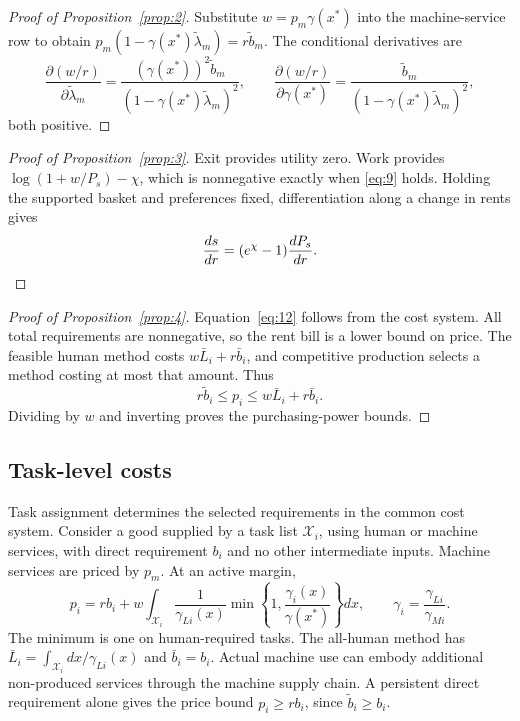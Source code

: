 \documentclass[12pt]{article}
\theoremstyle{plain}
\begin{document}
\begin{proof}[Proof of Proposition~\ref{prop:2}]
Substitute $w=p_m\gamma(x^*)$ into the machine-service row to obtain $p_m(1-\gamma(x^*)\widetilde{\lambda}_m)=r\widetilde{b}_m$. The conditional derivatives are
\[
\frac{\partial(w/r)}{\partial\widetilde{\lambda}_m}=\frac{(\gamma(x^*))^2\widetilde{b}_m}{(1-\gamma(x^*)\widetilde{\lambda}_m)^2},\qquad
\frac{\partial(w/r)}{\partial\gamma(x^*)}=\frac{\widetilde{b}_m}{(1-\gamma(x^*)\widetilde{\lambda}_m)^2},
\]
both positive.
\end{proof}

\begin{proof}[Proof of Proposition~\ref{prop:3}]
Exit provides utility zero. Work provides $\log(1+w/P_s)-\chi$, which is nonnegative exactly when \eqref{eq:9} holds. Holding the supported basket and preferences fixed, differentiation along a change in rents gives
\begin{equation}\label{eq:18}
\frac{ds}{dr}=(e^\chi-1)\frac{dP_s}{dr}.\qedhere
\end{equation}
\end{proof}

\begin{proof}[Proof of Proposition~\ref{prop:4}]
Equation~\eqref{eq:12} follows from the cost system. All total requirements are nonnegative, so the rent bill is a lower bound on price. The feasible human method costs $w\bar{L}_i+r\bar{b}_i$, and competitive production selects a method costing at most that amount. Thus
\begin{equation}\label{eq:19}
r\widetilde{b}_i\le p_i\le w\bar{L}_i+r\bar{b}_i.
\end{equation}
Dividing by $w$ and inverting proves the purchasing-power bounds.
\end{proof}

\subsection{Task-level costs}\label{app:A.3}

Task assignment determines the selected requirements in the common cost system. Consider a good supplied by a task list $\mathcal{X}_i$, using human or machine services, with direct requirement $b_i$ and no other intermediate inputs. Machine services are priced by $p_m$. At an active margin,
\begin{equation}\label{eq:20}
p_i=rb_i+w\int_{\mathcal{X}_i}\frac{1}{\gamma_{Li}(x)}\min\left\{1,\frac{\gamma_i(x)}{\gamma(x^*)}\right\}dx,\qquad
\gamma_i=\frac{\gamma_{Li}}{\gamma_{Mi}}.
\end{equation}
The minimum is one on human-required tasks. The all-human method has $\bar{L}_i=\int_{\mathcal{X}_i}dx/\gamma_{Li}(x)$ and $\bar{b}_i=b_i$. Actual machine use can embody additional non-produced services through the machine supply chain. A persistent direct requirement alone gives the price bound $p_i\ge rb_i$, since $\widetilde{b}_i\ge b_i$.
\end{document}

